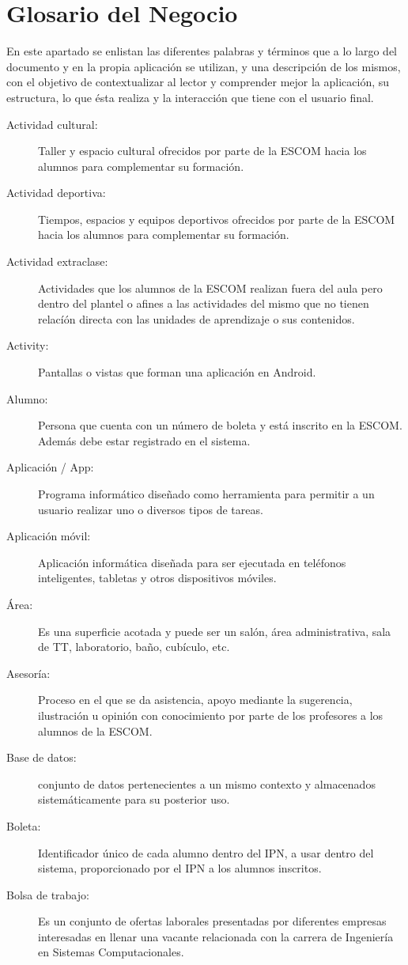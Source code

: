 \section{Glosario del Negocio}

\noindent
En este apartado se enlistan las diferentes palabras y términos que a lo largo del documento y en la propia aplicación se utilizan, y una descripción de los mismos, con el objetivo de contextualizar al lector y comprender mejor la aplicación, su estructura, lo que ésta realiza y la interacción que tiene con el usuario final. \\

\begin{description}
	\item[Actividad cultural:] Taller y espacio cultural ofrecidos por parte de la ESCOM hacia los alumnos para complementar su formación. 
	\item[Actividad deportiva:] Tiempos, espacios y equipos deportivos ofrecidos por parte de la ESCOM hacia los alumnos para complementar su formación. 
	\item[Actividad extraclase:] Actividades que los alumnos de la ESCOM realizan fuera del aula pero dentro del plantel o afines a las actividades del mismo que no tienen relacíón directa con las unidades de aprendizaje o sus contenidos. 
	\item[Activity:] Pantallas o vistas que forman una aplicación en Android.
	\item[Alumno:] Persona que cuenta con un número de boleta y está inscrito en la ESCOM. Además debe estar registrado en el sistema.
	\item[Aplicación / App:] Programa informático diseñado como herramienta para permitir a un usuario realizar uno o diversos tipos de tareas. 
	\item[Aplicación móvil:] Aplicación informática diseñada para ser ejecutada en teléfonos inteligentes, tabletas y otros dispositivos móviles. 
	\item[Área:] Es una superficie acotada y puede ser un salón, área administrativa, sala de TT, laboratorio, baño, cubículo, etc.
	\item[Asesoría:] Proceso en el que se da asistencia, apoyo mediante la sugerencia, ilustración u opinión con conocimiento por parte de los profesores a los alumnos de la ESCOM.
	
	\item[Base de datos:] conjunto de datos pertenecientes a un mismo contexto y almacenados sistemáticamente para su posterior uso.
	\item[Boleta:] Identificador único de cada alumno dentro del IPN, a usar dentro del sistema, proporcionado por el IPN a los alumnos inscritos.
	\item[Bolsa de trabajo:] Es un conjunto de ofertas laborales presentadas por diferentes empresas interesadas en llenar una vacante relacionada con la carrera de Ingeniería en 
	Sistemas Computacionales.
	

\end{description}
